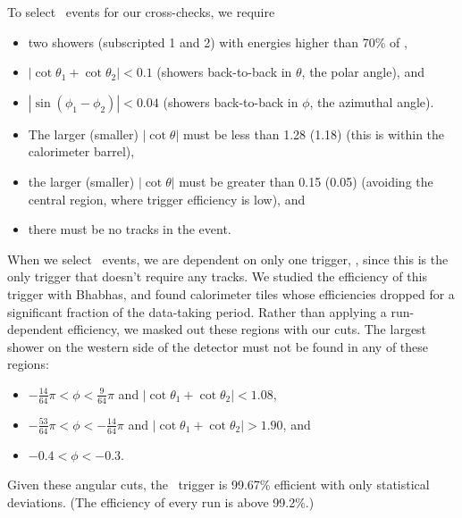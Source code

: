\documentclass{cornell}
\begin{document}
To select \gamgam\ events for our cross-checks, we require
\begin{itemize}

  \item two showers (subscripted 1 and 2) with energies higher than
    70\% of \ebeam,

  \item $|\cot\theta_1 + \cot\theta_2| < 0.1$ (showers back-to-back in
    $\theta$, the polar angle), and

  \item $|\sin(\phi_1 - \phi_2)| < 0.04$ (showers back-to-back in
    $\phi$, the azimuthal angle).

  \item The larger (smaller) $|\cot\theta|$ must be less than 1.28 (1.18)
    (this is within the calorimeter barrel),

  \item the larger (smaller) $|\cot\theta|$ must be greater than 0.15
  (0.05) (avoiding the central region, where trigger efficiency is
  low), and

  \item there must be no tracks in the event.

\end{itemize}
When we select \gamgam\ events, we are dependent on only one trigger,
\barrelbhabha, since this is the only trigger that doesn't
require any tracks.  We studied the efficiency of this trigger with
Bhabhas, and found calorimeter tiles whose efficiencies dropped for a
significant fraction of the data-taking period.  Rather than applying
a run-dependent efficiency, we masked out these regions with our cuts.
The largest shower on the western side of the detector must not be
found in any of these regions:
\begin{itemize}

  \item $-\frac{14}{64}\pi < \phi < \frac{9}{64}\pi$ and
    $|\cot\theta_1 + \cot\theta_2| < 1.08$,

  \item $-\frac{53}{64}\pi < \phi < -\frac{14}{64}\pi$ and
    $|\cot\theta_1 + \cot\theta_2| > 1.90$, and

  \item $-0.4 < \phi < -0.3$.

\end{itemize}
Given these angular cuts, the \barrelbhabha\ trigger is 99.67\%
efficient with only statistical deviations.  (The efficiency of every
run is above 99.2\%.)
\end{document}
